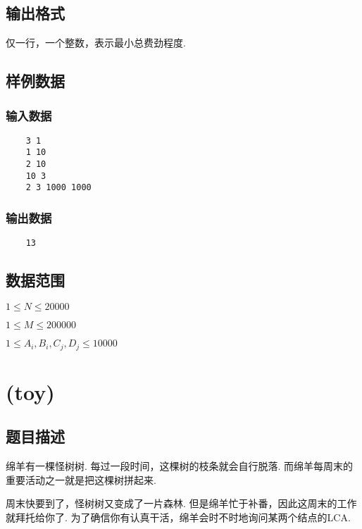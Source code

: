 \documentclass{article}
\begin{document}
\begin{CJK*}{UTF8}{gbsn}
    \subsection*{输出格式}
    仅一行，一个整数，表示最小总费劲程度.

    \subsection*{样例数据}
    \begin{multicols}{2}
    \subsubsection*{输入数据}
    \begin{verbatim}
    3 1
    1 10
    2 10
    10 3
    2 3 1000 1000
    \end{verbatim}

    \columnbreak

    \subsubsection*{输出数据}
    \begin{verbatim}
    13
    \end{verbatim}
    \end{multicols}

    \subsection*{数据范围}
    $1 \leq N \leq 20000$

    $1 \leq M \leq 200000$

    $1 \leq A_i, B_i, C_j, D_j \leq 10000$

    \newpage





    \section*{(toy)}
    \subsection*{题目描述}
    绵羊有一棵怪树树. 每过一段时间，这棵树的枝条就会自行脱落. 而绵羊每周末的重要活动之一就是把这棵树拼起来.

    周末快要到了，怪树树又变成了一片森林. 但是绵羊忙于补番，因此这周末的工作就拜托给你了. 为了确信你有认真干活，绵羊会时不时地询问某两个结点的LCA.


\end{CJK*}
\end{document}
